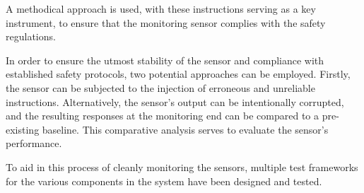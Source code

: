 A methodical approach is used, with these instructions serving as a key instrument, to ensure that the monitoring sensor complies with the safety regulations.

In order to ensure the utmost stability of the sensor and compliance with established safety protocols, two potential approaches can be employed. Firstly, the sensor can be subjected to the injection of erroneous and unreliable instructions. Alternatively, the sensor's output can be intentionally corrupted, and the resulting responses at the monitoring end can be compared to a pre-existing baseline. This comparative analysis serves to evaluate the sensor's performance.

To aid in this process of cleanly monitoring the sensors, multiple test frameworks for the various components in the system have been designed and tested.